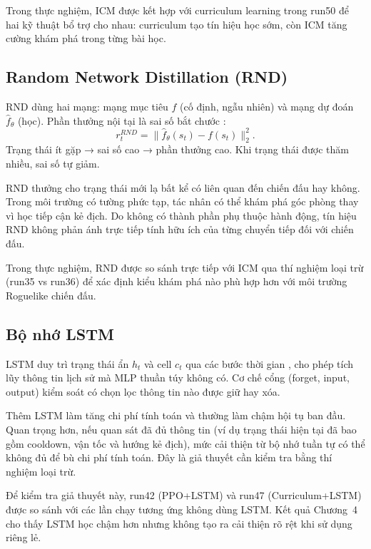 Trong thực nghiệm, ICM được kết hợp với curriculum learning trong run50 để hai kỹ thuật bổ trợ cho nhau: curriculum tạo tín hiệu học sớm, còn ICM tăng cường khám phá trong từng bài học.

\subsection{Random Network Distillation (RND)}

RND dùng hai mạng: mạng mục tiêu $f$ (cố định, ngẫu nhiên) và mạng dự đoán $\hat{f}_\theta$ (học). Phần thưởng nội tại là sai số bắt chước \cite{Burda2018}:
\begin{equation}
    r_t^{RND} = \|\hat{f}_\theta(s_t) - f(s_t)\|_2^2.
\end{equation}
Trạng thái ít gặp → sai số cao → phần thưởng cao. Khi trạng thái được thăm nhiều, sai số tự giảm.

RND thưởng cho trạng thái mới lạ bất kể có liên quan đến chiến đấu hay không. Trong môi trường có tường phức tạp, tác nhân có thể khám phá góc phòng thay vì học tiếp cận kẻ địch. Do không có thành phần phụ thuộc hành động, tín hiệu RND không phản ánh trực tiếp tính hữu ích của từng chuyển tiếp đối với chiến đấu.

Trong thực nghiệm, RND được so sánh trực tiếp với ICM qua thí nghiệm loại trừ (run35 vs run36) để xác định kiểu khám phá nào phù hợp hơn với môi trường Roguelike chiến đấu.

\subsection{Bộ nhớ LSTM}

LSTM duy trì trạng thái ẩn $h_t$ và cell $c_t$ qua các bước thời gian \cite{Hochreiter1997}, cho phép tích lũy thông tin lịch sử mà MLP thuần túy không có. Cơ chế cổng (forget, input, output) kiểm soát có chọn lọc thông tin nào được giữ hay xóa.

Thêm LSTM làm tăng chi phí tính toán và thường làm chậm hội tụ ban đầu. Quan trọng hơn, nếu quan sát đã đủ thông tin (ví dụ trạng thái hiện tại đã bao gồm cooldown, vận tốc và hướng kẻ địch), mức cải thiện từ bộ nhớ tuần tự có thể không đủ để bù chi phí tính toán. Đây là giả thuyết cần kiểm tra bằng thí nghiệm loại trừ.

Để kiểm tra giả thuyết này, run42 (PPO+LSTM) và run47 (Curriculum+LSTM) được so sánh với các lần chạy tương ứng không dùng LSTM. Kết quả Chương~4 cho thấy LSTM học chậm hơn nhưng không tạo ra cải thiện rõ rệt khi sử dụng riêng lẻ.

